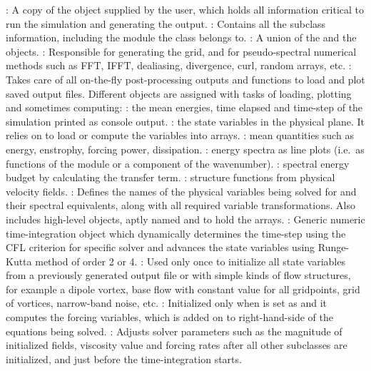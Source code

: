 \documentclass{../jors}
\begin{document}
\begin{outline}
\1 : A copy of the  object supplied
by the user, which holds all information critical to run the simulation and
generating the output.
%
\1 : Contains all the subclass information,
including the module the class belongs to.
%
\1 : A union of the  and the
 objects.
%
\1 : Responsible for generating the grid, and for
pseudo-spectral numerical methods such as FFT, IFFT, dealiasing, divergence,
curl, random arrays, etc.
%
\1 : Takes care of all on-the-fly post-processing
outputs and functions to load and plot saved output files. Different objects
are assigned with tasks of loading, plotting and sometimes computing:
%
\2 : the mean energies, time elapsed and
time-step of the simulation printed as console output.
%
\2 : the state variables in the physical
plane.  It relies on  to load or compute the variables
into arrays.
%
\2 : mean quantities such as energy,
enstrophy, forcing power, dissipation.
%
\2 : energy spectra as line plots (i.e.\ as
functions of the module or a component of the wavenumber).
%
\2 : spectral energy budget by
calculating the transfer term.
%
\2 : structure functions from physical
velocity fields.
%
\1 : Defines the names of the physical variables being
solved for and their spectral equivalents, along with all required variable
transformations.
%
Also includes high-level objects, aptly named 
and  to hold the arrays.
%
\1 : Generic numeric time-integration object
which dynamically determines the time-step using the CFL criterion for specific
solver and advances the state variables using Runge-Kutta method of order 2 or
4.
%
\1 : Used only once to initialize all state variables
from a previously generated output file or with simple kinds of flow structures,
for example a dipole vortex, base flow with constant value for all gridpoints,
grid of vortices, narrow-band noise, etc.
%
\1 : Initialized only when
 is set as  and it computes
the forcing variables, which is added on to right-hand-side of the equations
being solved.
%
\1 : Adjusts solver parameters such as the magnitude
of initialized fields, viscosity value and forcing rates after all other
subclasses are initialized, and just before the time-integration starts.
\end{outline}
\end{document}
